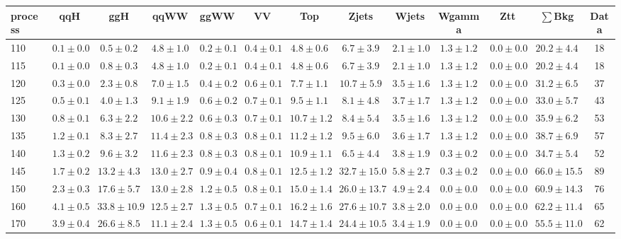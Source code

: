 \begin{table}
{ \tiny
 \begin{center}
 \begin{tabular}{l | c c | c c c c c c c c  | c c}
 \hline
 process & qqH & ggH & qqWW & ggWW & VV & Top & Zjets & Wjets & Wgamma & Ztt & $\sum$Bkg & Data \\
\hline
110 & $0.1\pm0.0$ & $0.5\pm0.2$ & $4.8\pm1.0$ & $0.2\pm0.1$ & $0.4\pm0.1$ & $4.8\pm0.6$ & $6.7\pm3.9$ & $2.1\pm1.0$ & $1.3\pm1.2$ & $0.0\pm0.0$ & $20.2\pm4.4$ & 18 \\
115 & $0.1\pm0.0$ & $0.8\pm0.3$ & $4.8\pm1.0$ & $0.2\pm0.1$ & $0.4\pm0.1$ & $4.8\pm0.6$ & $6.7\pm3.9$ & $2.1\pm1.0$ & $1.3\pm1.2$ & $0.0\pm0.0$ & $20.2\pm4.4$ & 18 \\
120 & $0.3\pm0.0$ & $2.3\pm0.8$ & $7.0\pm1.5$ & $0.4\pm0.2$ & $0.6\pm0.1$ & $7.7\pm1.1$ & $10.7\pm5.9$ & $3.5\pm1.6$ & $1.3\pm1.2$ & $0.0\pm0.0$ & $31.2\pm6.5$ & 37 \\
125 & $0.5\pm0.1$ & $4.0\pm1.3$ & $9.1\pm1.9$ & $0.6\pm0.2$ & $0.7\pm0.1$ & $9.5\pm1.1$ & $8.1\pm4.8$ & $3.7\pm1.7$ & $1.3\pm1.2$ & $0.0\pm0.0$ & $33.0\pm5.7$ & 43 \\
130 & $0.8\pm0.1$ & $6.3\pm2.2$ & $10.6\pm2.2$ & $0.6\pm0.3$ & $0.7\pm0.1$ & $10.7\pm1.2$ & $8.4\pm5.4$ & $3.5\pm1.6$ & $1.3\pm1.2$ & $0.0\pm0.0$ & $35.9\pm6.2$ & 53 \\
135 & $1.2\pm0.1$ & $8.3\pm2.7$ & $11.4\pm2.3$ & $0.8\pm0.3$ & $0.8\pm0.1$ & $11.2\pm1.2$ & $9.5\pm6.0$ & $3.6\pm1.7$ & $1.3\pm1.2$ & $0.0\pm0.0$ & $38.7\pm6.9$ & 57 \\
140 & $1.3\pm0.2$ & $9.6\pm3.2$ & $11.6\pm2.3$ & $0.8\pm0.3$ & $0.8\pm0.1$ & $10.9\pm1.1$ & $6.5\pm4.4$ & $3.8\pm1.9$ & $0.3\pm0.2$ & $0.0\pm0.0$ & $34.7\pm5.4$ & 52 \\
145 & $1.7\pm0.2$ & $13.2\pm4.3$ & $13.0\pm2.7$ & $0.9\pm0.4$ & $0.8\pm0.1$ & $12.5\pm1.2$ & $32.7\pm15.0$ & $5.8\pm2.7$ & $0.3\pm0.2$ & $0.0\pm0.0$ & $66.0\pm15.5$ & 89 \\
150 & $2.3\pm0.3$ & $17.6\pm5.7$ & $13.0\pm2.8$ & $1.2\pm0.5$ & $0.8\pm0.1$ & $15.0\pm1.4$ & $26.0\pm13.7$ & $4.9\pm2.4$ & $0.0\pm0.0$ & $0.0\pm0.0$ & $60.9\pm14.3$ & 76 \\
160 & $4.1\pm0.5$ & $33.8\pm10.9$ & $12.5\pm2.7$ & $1.3\pm0.5$ & $0.7\pm0.1$ & $16.2\pm1.6$ & $27.6\pm10.7$ & $3.8\pm2.0$ & $0.0\pm0.0$ & $0.0\pm0.0$ & $62.2\pm11.4$ & 65 \\
170 & $3.9\pm0.4$ & $26.6\pm8.5$ & $11.1\pm2.4$ & $1.3\pm0.5$ & $0.6\pm0.1$ & $14.7\pm1.4$ & $24.4\pm10.5$ & $3.4\pm1.9$ & $0.0\pm0.0$ & $0.0\pm0.0$ & $55.5\pm11.0$ & 62 \\

\end{tabular}
\end{center}}
\end{table}
